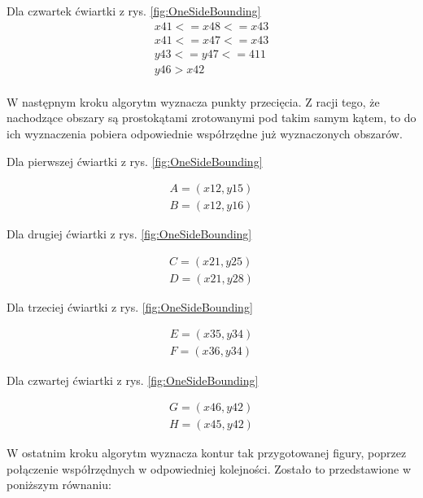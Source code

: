 Dla czwartek ćwiartki z rys. \ref{fig:OneSideBounding}
\begin{equation}
\begin{split}
x41 <= x48 <= x43 \\
x41 <= x47 <= x43 \\
y43 <= y47 <= 411 \\
y46 > x42 \\
\end{split}
\end{equation}

W następnym kroku algorytm wyznacza punkty przecięcia. Z racji tego, że nachodzące obszary są prostokątami zrotowanymi pod takim samym kątem, to do ich wyznaczenia pobiera odpowiednie współrzędne już wyznaczonych obszarów.

Dla pierwszej ćwiartki z rys. \ref{fig:OneSideBounding}

\begin{equation}
\begin{split}
A = (x12, y15) \\
B = (x12, y16)
\end{split}
\end{equation}

Dla drugiej ćwiartki z rys. \ref{fig:OneSideBounding}

\begin{equation}
\begin{split}
C = (x21, y25) \\
D = (x21, y28)
\end{split}
\end{equation}

Dla trzeciej ćwiartki z rys. \ref{fig:OneSideBounding}

\begin{equation}
\begin{split}
E = (x35, y34) \\
F = (x36, y34)
\end{split}
\end{equation}


Dla czwartej ćwiartki z rys. \ref{fig:OneSideBounding}

\begin{equation}
\begin{split}
G = (x46, y42) \\
H = (x45, y42)
\end{split}
\end{equation}

W ostatnim kroku algorytm wyznacza kontur tak przygotowanej figury, poprzez połączenie współrzędnych w odpowiedniej kolejności. Zostało to przedstawione w poniższym równaniu:

